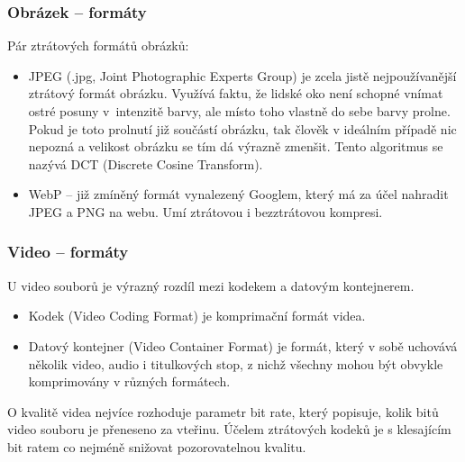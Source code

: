 \documentclass[aspectratio=169,11pt,svgnames]{beamer}
\begin{document}
\begin{frame}
 \frametitle{Obrázek -- formáty}
 Pár ztrátových formátů obrázků:
 \begin{itemize}[label=\textbullet]
  \item \alert{JPEG} (.jpg, Joint Photographic Experts Group) je zcela jistě
   nejpoužívanější ztrátový formát obrázku. Využívá faktu, že lidské oko není
   schopné vnímat ostré posuny v~intenzitě barvy, ale místo toho vlastně do sebe
   barvy prolne. Pokud je toto prolnutí již součástí obrázku, tak člověk v
   ideálním případě nic nepozná a velikost obrázku se tím dá výrazně zmenšit.
   Tento algoritmus  se nazývá DCT (Discrete Cosine Transform).
  \pause
  \item \alert{WebP} -- již zmíněný formát vynalezený Googlem, který má za účel
   nahradit JPEG a PNG na webu. Umí ztrátovou i bezztrátovou kompresi.
\end{itemize}
\end{frame}

\begin{frame}
 \frametitle{Video -- formáty}
 U video souborů je výrazný rozdíl mezi \alert{kodekem} a \alert{datovým
 kontejnerem}.
 \pause
 \begin{itemize}[label=\textbullet]
  \item \alert{Kodek} (Video Coding Format) je komprimační formát videa.
  \pause
  \item \alert{Datový kontejner} (Video Container Format) je formát, který v
   sobě uchovává několik video, audio i titulkových stop, z nichž všechny mohou
   být obvykle komprimovány v různých formátech.
 \end{itemize}
 \pause
 O kvalitě videa nejvíce rozhoduje parametr \alert{bit rate}, který popisuje,
 kolik bitů video souboru je přeneseno za vteřinu. Účelem ztrátových kodeků je s
 klesajícím bit ratem co nejméně snižovat pozorovatelnou kvalitu.
\end{frame}
\end{document}
